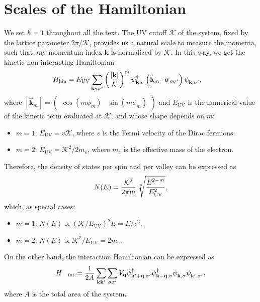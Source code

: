\documentclass[english,aps,prd,nofootinbib,twocolumn]{revtex4-1}
\begin{document}
\section{Scales of the Hamiltonian}
We set $\hbar = 1$ throughout all the text. The UV cutoff $\mathcal{K}$ of the system, fixed by the lattice parameter $2\pi/\mathcal{K}$, provides us a natural scale to measure the momenta, such that any momentum index $\mathbf{k}$ is normalized by $\mathcal{K}$. In this way, we get the kinetic non-interacting Hamiltonian
\begin{equation}
\label{eq:Main-Ham}
\begin{split}
&H_{\mathrm{kin}} = 
E_{\mathrm{UV} }\sum_{\mathbf{k }\sigma\sigma'}
\left(\frac{|\mathbf{k}|}{\mathcal{K}}\right)^{m}
\psi_{\mathbf{k },\sigma}^{\textcolor{black}{\dagger}}
\left( \hat{\mathbf{k}}_{m} \cdot 
\boldsymbol{\sigma}_{\sigma\sigma'} \right)
\psi_{\mathbf{k },\sigma'}^{\textcolor{white}{\dagger}}
,
\end{split}
\end{equation}
where $[\hat{\mathbf{k}}_{m}]= 
\begin{pmatrix}
\cos(m\phi_{m})	&	\!\!\sin(m\phi_{m})
\end{pmatrix}$ and $E_{\mathrm{UV} }$ is the numerical value of the kinetic term evaluated at $\mathcal{K}$, and whose shape depends on $m$:
\begin{itemize}
\item $m=1$: $E_{\mathrm{UV} } = v\mathcal{K}$, where $v$ is the Fermi velocity of the Dirac fermions.
\item $m=2$: $E_{\mathrm{UV} } = \mathcal{K}^{2}/2m_{e}$, where $m_{e}$ is the effective mass of the electron. 
\end{itemize}
Therefore, the density of states per spin and per valley can be expressed as
\begin{equation}
N(E) = \frac{\mathcal{K}^{2}}{2\pi m}
\sqrt[m]{
\frac{E^{2-m}_{\textcolor{white}{b}}}
{E_{\mathrm{UV}}^{2}}},
\end{equation}
which, as special cases:
\begin{itemize}
\item $m=1$: $N(E)\propto (\mathcal{K}/E_{\mathrm{UV}})^{2}E=E/ v^{2}$.
\item $m=2$: $N(E)\propto \mathcal{K}^{2}/E_{\mathrm{UV}}=2m_{e}$.
\end{itemize}
On the other hand, the interaction Hamiltonian can be expressed as
\begin{eqnarray}
&H&\!_{\mathrm{int}} =
\frac{1}{2A}
\sum_{\mathbf{k }\mathbf{k'}}
\sum_{\sigma \sigma'} 
V_{\mathbf{q}}
\psi_{\mathbf{k'+q,\sigma'}}^{\textcolor{black}{\dagger}}
\psi_{\mathbf{k -q,\sigma }}^{\textcolor{black}{\dagger}}
\psi_{\mathbf{k   ,\sigma }}^{\textcolor{white}{\dagger}}
\psi_{\mathbf{k'  ,\sigma'}}^{\textcolor{white}{\dagger}},
\end{eqnarray}
where $A$ is the total area of the system.
\end{document}
